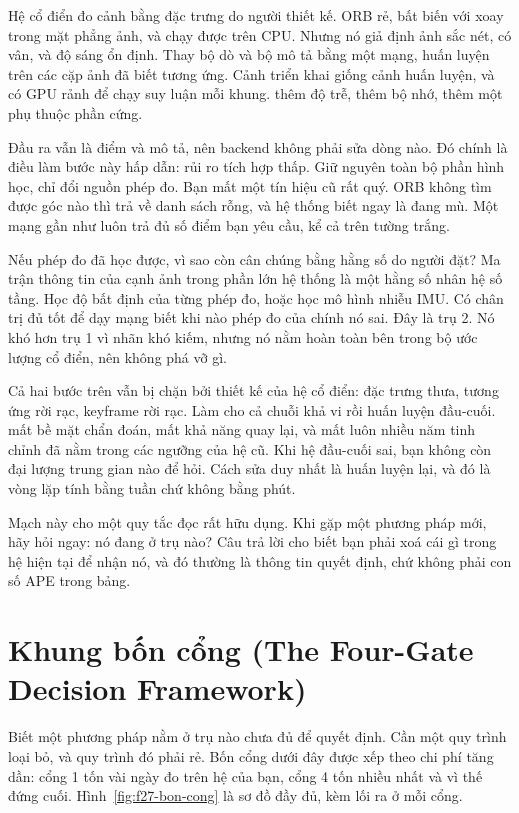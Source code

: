 \documentclass[../../deep_learning.tex]{subfiles}
\begin{document}
\begin{mach}
\item \vd Hệ cổ điển đo cảnh bằng đặc trưng do người thiết kế. ORB rẻ, bất biến với xoay trong mặt phẳng ảnh, và chạy được trên CPU. Nhưng nó giả định ảnh sắc nét, có vân, và độ sáng ổn định.
  \gp Thay bộ dò và bộ mô tả bằng một mạng, huấn luyện trên các cặp ảnh đã biết tương ứng.
  \gd Cảnh triển khai giống cảnh huấn luyện, và có GPU rảnh để chạy suy luận mỗi khung.
  \gia thêm độ trễ, thêm bộ nhớ, thêm một phụ thuộc phần cứng.
\item \vd Đầu ra vẫn là điểm và mô tả, nên backend không phải sửa dòng nào. Đó chính là điều làm bước này hấp dẫn: rủi ro tích hợp thấp.
  \gp Giữ nguyên toàn bộ phần hình học, chỉ đổi nguồn phép đo.
  \vdm Bạn mất một tín hiệu cũ rất quý. ORB không tìm được góc nào thì trả về danh sách rỗng, và hệ thống biết ngay là đang mù. Một mạng gần như luôn trả đủ số điểm bạn yêu cầu, kể cả trên tường trắng.
\item \vd Nếu phép đo đã học được, vì sao còn cân chúng bằng hằng số do người đặt? Ma trận thông tin của cạnh ảnh trong phần lớn hệ thống là một hằng số nhân hệ số tầng.
  \gp Học độ bất định của từng phép đo, hoặc học mô hình nhiễu IMU.
  \gd Có chân trị đủ tốt để dạy mạng biết khi nào phép đo của chính nó sai.
  \hq Đây là trụ 2. Nó khó hơn trụ 1 vì nhãn khó kiếm, nhưng nó nằm hoàn toàn bên trong bộ ước lượng cổ điển, nên không phá vỡ gì.
\item \vd Cả hai bước trên vẫn bị chặn bởi thiết kế của hệ cổ điển: đặc trưng thưa, tương ứng rời rạc, keyframe rời rạc.
  \gp Làm cho cả chuỗi khả vi rồi huấn luyện đầu-cuối.
  \gia mất bề mặt chẩn đoán, mất khả năng quay lại, và mất luôn nhiều năm tinh chỉnh đã nằm trong các ngưỡng của hệ cũ.
  \vdm Khi hệ đầu-cuối sai, bạn không còn đại lượng trung gian nào để hỏi. Cách sửa duy nhất là huấn luyện lại, và đó là vòng lặp tính bằng tuần chứ không bằng phút.
\end{mach}

Mạch này cho một quy tắc đọc rất hữu dụng. Khi gặp một phương pháp mới, hãy hỏi ngay: nó đang ở trụ nào? Câu trả lời cho biết bạn phải xoá cái gì trong hệ hiện tại để nhận nó, và đó thường là thông tin quyết định, chứ không phải con số APE trong bảng.

\section{Khung bốn cổng (The Four-Gate Decision Framework)}
Biết một phương pháp nằm ở trụ nào chưa đủ để quyết định. Cần một quy trình loại bỏ, và quy trình đó phải rẻ. Bốn cổng dưới đây được xếp theo chi phí tăng dần: cổng 1 tốn vài ngày đo trên hệ của bạn, cổng 4 tốn nhiều nhất và vì thế đứng cuối. Hình~\ref{fig:f27-bon-cong} là sơ đồ đầy đủ, kèm lối ra ở mỗi cổng.
\end{document}
